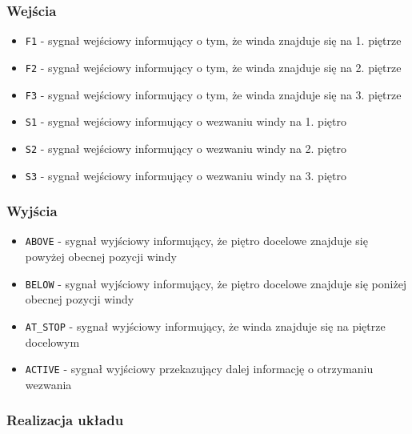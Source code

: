 \documentclass[a4paper]{article}
\begin{document}
\subsubsection{Wejścia}
\begin{itemize}
    \item \verb|F1| - sygnał wejściowy informujący o tym, że winda znajduje się na 1. piętrze
    \item \verb|F2| - sygnał wejściowy informujący o tym, że winda znajduje się na 2. piętrze
    \item \verb|F3| - sygnał wejściowy informujący o tym, że winda znajduje się na 3. piętrze
    \item \verb|S1| - sygnał wejściowy informujący o wezwaniu windy na 1. piętro
    \item \verb|S2| - sygnał wejściowy informujący o wezwaniu windy na 2. piętro
    \item \verb|S3| - sygnał wejściowy informujący o wezwaniu windy na 3. piętro
\end{itemize}

\subsubsection{Wyjścia}
\begin{itemize}
    \item \verb|ABOVE| - sygnał wyjściowy informujący, że piętro docelowe znajduje się powyżej obecnej pozycji windy  
    \item \verb|BELOW| - sygnał wyjściowy informujący, że piętro docelowe znajduje się poniżej obecnej pozycji windy
    \item \verb|AT_STOP| - sygnał wyjściowy informujący, że winda znajduje się na piętrze docelowym
    \item \verb|ACTIVE| - sygnał wyjściowy przekazujący dalej informację o otrzymaniu wezwania
\end{itemize}

\subsubsection{Realizacja układu}
\end{document}

